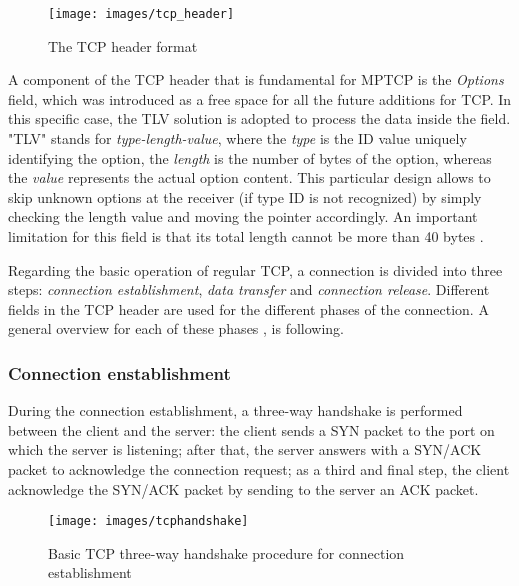 \begin{figure}[!htb]
\centering
\texttt{[image: images/tcp\_header]}
\caption{The TCP header format}
\label{fig:tcp_header}
\end{figure}

A component of the TCP header that is fundamental for MPTCP is the \textit{Options} field, which was introduced as a free space for all the future additions for TCP. In this specific case, the TLV solution is adopted to process the data inside the field. "TLV" stands for \textit{type-length-value}, where the \textit{type} is the ID value uniquely identifying the option, the \textit{length} is the number of bytes of the option, whereas the \textit{value} represents the actual option content. This particular design allows to skip unknown options at the receiver (if type ID is not recognized) by simply checking the length value and moving the pointer accordingly. An important limitation for this field is that its total length cannot be more than 40 bytes \cite{rfc793}.

Regarding the basic operation of regular TCP, a connection is divided into three steps: \textit{connection establishment}, \textit{data transfer} and \textit{connection release}. Different fields in the TCP header are used for the different phases of the connection. A general overview for each of these phases \cite{rfc793}, is following.

\subsubsection{Connection enstablishment}
During the connection establishment, a  three-way handshake is performed between the client and the server: the client sends a SYN packet to the port on which the server is listening; after that, the server answers with a SYN/ACK packet to acknowledge the connection request; as a third and final step, the client acknowledge the SYN/ACK packet by sending to the server an ACK packet.

\begin{figure}[!htb]
\centering
\texttt{[image: images/tcphandshake]}
\caption{Basic TCP three-way handshake procedure for connection establishment}
\label{fig:tcphandshake}
\end{figure}


